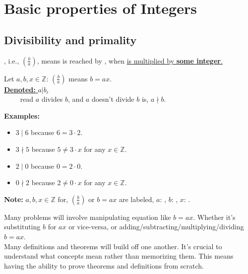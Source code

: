 \chapter{Basic properties of Integers}

\section{Divisibility and primality}

, i.e., $\left(\frac{b}{a}\right)$, means  is reached by , when \underline{ is multiplied by \textbf{some integer}.}

\begin{Def}[Division]

    \label{def:division}

    Let $a,b,x\in\mathbb{Z}$: $\left(\frac{b}{a}\right)$ means $b=ax$.\\

    \noindent
    \underline{\textbf{Denoted:} $a|b$,}\\
    $\qquad$ read $a$ divides $b$, and $a$ doesn't divide $b$ is, $a\nmid b$.\\
    \noindent
\end{Def}

\noindent
\textbf{Examples:}
\begin{itemize}
    \item $3\mid 6$ because $6=3\cdot2$.
    \item $3\nmid5$ because $5\neq3\cdot x$ for any $x\in\mathbb{Z}$.
    \item $2\mid 0$ because $0=2\cdot0$.
    \item $0\nmid2$ because $2\neq0\cdot x$ for any $x\in\mathbb{Z}$.
\end{itemize}


\begin{Note}
    \textbf{Note:} $a,b,x\in\mathbb{Z}$ for, $\left(\frac{b}{a}\right)$ or $b = ax$ are labeled, $a$: , $b$: , $x$: .
\end{Note}

\begin{Tip}
    Many problems will involve manipulating equation like $b=ax$. Whether
    it's substituting $b$ for $ax$ or vice-versa, or adding/subtracting/multiplying/dividing $b=ax$.\\

    \noindent
    Many definitions and theorems will build off one another.
    It's crucial to understand what concepts mean rather than memorizing them. This means
    having the ability to prove theorems and definitions from scratch.
\end{Tip}


